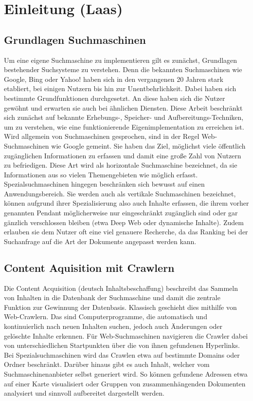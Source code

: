 \chapter{Einleitung \small(Laas)}

\section{Grundlagen Suchmaschinen}
Um eine eigene Suchmaschine zu implementieren gilt es zunächst, Grundlagen bestehender Suchsysteme zu verstehen. Denn die bekannten Suchmaschinen wie Google, Bing oder Yahoo! haben sich in den vergangenen 20 Jahren stark etabliert, bei einigen Nutzern bis hin zur Unentbehrlichkeit. Dabei haben sich bestimmte Grundfunktionen durchgesetzt. An diese haben sich die Nutzer gewöhnt und erwarten sie auch bei ähnlichen Diensten. Diese Arbeit beschränkt sich zunächst auf bekannte Erhebungs-, Speicher- und Aufbereitungs-Techniken, um zu verstehen, wie eine funktionierende Eigenimplementation zu erreichen ist.\\
Wird allgemein von Suchmaschinen gesprochen, sind in der Regel Web-Suchmaschinen wie Google gemeint. Sie haben das Ziel, möglichst viele öffentlich zugänglichen Informationen zu erfassen und damit eine große Zahl von Nutzern zu befriedigen. Diese Art wird als horizontale Suchmaschine bezeichnet, da sie Informationen aus so vielen Themengebieten wie möglich erfasst.\\
Spezialsuchmaschinen hingegen beschränken sich bewusst auf einen Anwendungsbereich. Sie werden auch als vertikale Suchmaschinen bezeichnet, können aufgrund ihrer Spezialisierung also auch Inhalte erfassen, die ihrem vorher genannten Pendant möglicherweise nur eingeschränkt zugänglich sind oder gar gänzlich verschlossen bleiben (etwa Deep Web oder dynamische Inhalte). Zudem erlauben sie dem Nutzer oft eine viel genauere Recherche, da das Ranking bei der Suchanfrage auf die Art der Dokumente angepasst werden kann.

\section{Content Aquisition mit Crawlern}
Die Content Acquisition (deutsch Inhaltsbeschaffung) beschreibt das Sammeln von Inhalten in die Datenbank der Suchmaschine und damit die zentrale Funktion zur Gewinnung der Datenbasis. Klassisch geschieht dies mithilfe von Web-Crawlern. Das sind Computerprogramme, die automatisch und kontinuierlich nach neuen Inhalten suchen, jedoch auch Änderungen oder gelöschte Inhalte erkennen. Für Web-Suchmaschinen navigieren die Crawler dabei von unterschiedlichen Startpunkten über die von ihnen gefundenen Hyperlinks. Bei Spezialsuchmaschinen wird das Crawlen etwa auf bestimmte Domains oder Ordner beschränkt. Darüber hinaus gibt es auch Inhalt, welcher vom Suchmaschinenanbieter selbst generiert wird. So können gefundene Adressen etwa auf einer Karte visualisiert oder Gruppen von zusammenhängenden Dokumenten analysiert und sinnvoll aufbereitet dargestellt werden.

